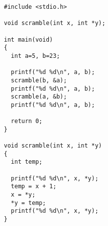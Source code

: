 \begin{verbatim}
#include <stdio.h>

void scramble(int x, int *y);

int main(void)
{
  int a=5, b=23;

  printf("%d %d\n", a, b);
  scramble(b, &a);
  printf("%d %d\n", a, b);
  scramble(a, &b);
  printf("%d %d\n", a, b);

  return 0;
}

void scramble(int x, int *y)
{
  int temp;

  printf("%d %d\n", x, *y);
  temp = x + 1;
  x = *y;
  *y = temp;
  printf("%d %d\n", x, *y);
}
\end{verbatim}

